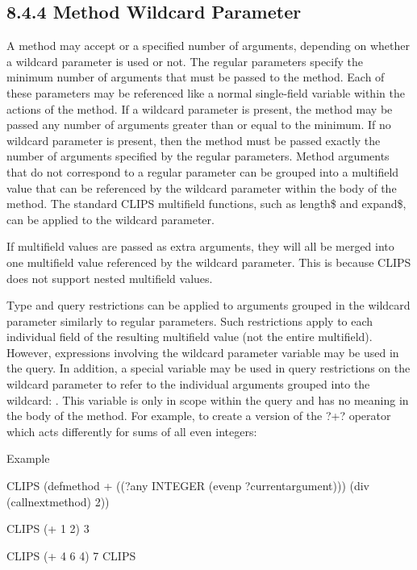 \documentclass[letterpaper,10pt,english]{sphinxmanual}
\begin{document}
\subsection{8.4.4 Method Wildcard Parameter}
\label{\detokenize{generic:method-wildcard-parameter}}
A method may accept  or  a specified number of
arguments, depending on whether a wildcard parameter is used or not. The
regular parameters specify the minimum number of arguments that must be
passed to the method. Each of these parameters may be referenced like a
normal single-field variable within the actions of the method. If a
wildcard parameter is present, the method may be passed any number of
arguments greater than or equal to the minimum. If no wildcard parameter
is present, then the method must be passed exactly the number of
arguments specified by the regular parameters. Method arguments that do
not correspond to a regular parameter can be grouped into a multifield
value that can be referenced by the wildcard parameter within the body
of the method. The standard CLIPS multifield functions, such as length\$
and expand\$, can be applied to the wildcard parameter.

If multifield values are passed as extra arguments, they will all be
merged into one multifield value referenced by the wildcard parameter.
This is because CLIPS does not support nested multifield values.

Type and query restrictions can be applied to arguments grouped in the
wildcard parameter similarly to regular parameters. Such restrictions
apply to each individual field of the resulting multifield value (not
the entire multifield). However, expressions involving the wildcard
parameter variable may be used in the query. In addition, a special
variable may be used in query restrictions on the wildcard parameter to
refer to the individual arguments grouped into the wildcard:
. This variable is only in scope within the query
and has no meaning in the body of the method. For example, to create a
version of the ?+? operator which acts differently for sums of all even
integers:

Example

\begin{sphinxVerbatim}[commandchars=\\\{\}]
CLIPS\PYGZgt{} (defmethod + ((\PYGZdl{}?any INTEGER (evenp ?current\PYGZhy{}argument)))
  (div (call\PYGZhy{}next\PYGZhy{}method) 2))

CLIPS\PYGZgt{} (+ 1 2)
3

CLIPS\PYGZgt{} (+ 4 6 4)
7
CLIPS\PYGZgt{}
\end{sphinxVerbatim}
\end{document}
